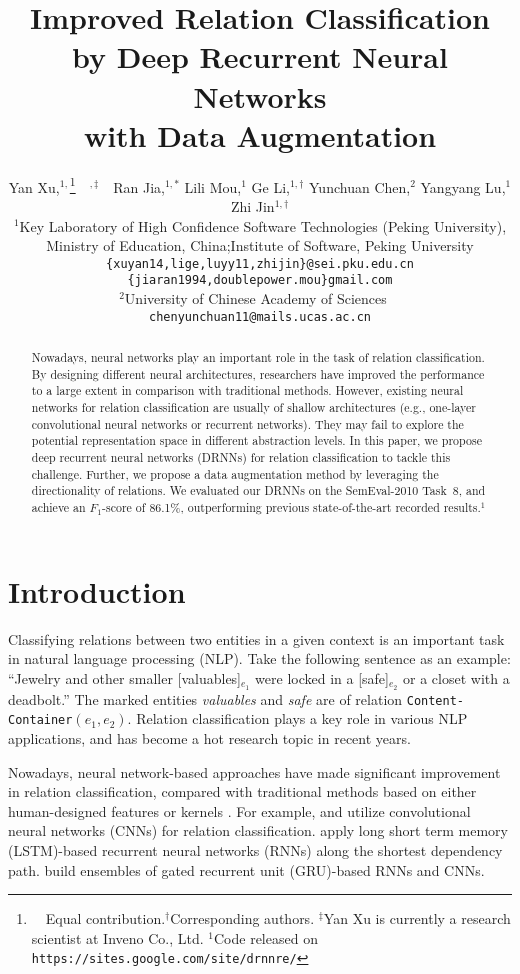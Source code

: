 \documentclass[11pt]{article}
\title{Improved Relation Classification by Deep Recurrent Neural Networks\\
 with Data Augmentation}
\author{Yan Xu,$^{1,}$\thanks{\ \ Equal contribution.\quad $^\dag$Corresponding authors.
\quad $^\ddag$Yan Xu is currently a research scientist at Inveno Co., Ltd.\quad\hspace{1cm}{\color{white}{.}} 
{\color{white}{.}}\hspace{.4cm} $^1$Code released on \texttt{https://sites.google.com/site/drnnre/}}\ \ $^{\!,\ddag}$\ \  Ran Jia,$^{1,*}$ Lili Mou,$^1$ Ge Li,$^{1,\dag}$ Yunchuan Chen,$^2$ Yangyang Lu,$^1$ Zhi Jin$^{1,\dag}$\\
$^{1}$Key Laboratory of High Confidence Software Technologies (Peking University),\\ Ministry of Education, China;\quad Institute of Software, Peking University\\
{\tt \{xuyan14,lige,luyy11,zhijin\}@sei.pku.edu.cn}\\
{\tt\{jiaran1994,doublepower.mou\}gmail.com}\\
$^{2}$University of Chinese Academy of Sciences\ \ { \texttt{chenyunchuan11@mails.ucas.ac.cn}}\\ 
}
\date{}
\begin{document}
\maketitle
\begin{abstract}
  Nowadays, neural networks play an important role in the task of relation classification.
By designing different neural architectures, researchers have improved the performance to a large extent in comparison with traditional methods. However, existing neural networks for relation classification are usually of shallow architectures (e.g., one-layer convolutional neural networks or recurrent networks). They may fail to explore the potential representation space in different abstraction levels. In this paper, we propose deep recurrent neural networks (DRNNs) for relation classification to tackle this challenge. Further, we propose a data augmentation method by leveraging the directionality of relations. We evaluated our DRNNs on the SemEval-2010 Task~8, and achieve an $F_1$-score of 86.1\%, outperforming previous state-of-the-art recorded results.$^1$
\end{abstract}

\section{Introduction}
Classifying relations between two entities in a given context is an important task in natural language processing (NLP). Take the following sentence as an example: ``Jewelry and other smaller [valuables]$_{e_1}$ were locked in a [safe]$_{e_2}$ or a closet with a deadbolt.'' The marked entities \textit{valuables} and \textit{safe} are of relation {\tt Content-Container}$({e_1}, {e_2})$. Relation classification plays a key role in various NLP applications, and has become a hot research topic in recent years.

Nowadays, neural network-based approaches have made significant improvement in relation classification, compared with traditional methods based on either human-designed features \cite{MaxEntRE,2010SVM} or kernels \cite{SpdKernel,EmbedTreeK}. For example,  and  utilize convolutional neural networks (CNNs) for relation classification.  apply long short term memory (LSTM)-based recurrent neural networks (RNNs) along the shortest dependency path.  build ensembles of gated recurrent unit (GRU)-based RNNs and CNNs.
\end{document}

